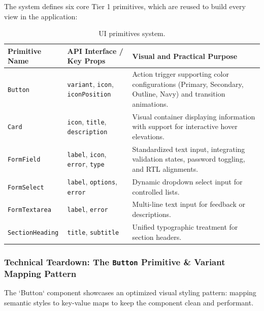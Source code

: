 \documentclass[12pt,a4paper]{article}
\begin{document}
The system defines six core Tier 1 primitives, which are reused to build every view in the application:

\begin{table}[H]
\centering
\begin{tabular}{@{}llp{7cm}@{}}
\toprule
\textbf{Primitive Name} & \textbf{API Interface / Key Props} & \textbf{Visual and Practical Purpose} \\
\midrule
\texttt{Button} & \texttt{variant}, \texttt{icon}, \texttt{iconPosition} & Action trigger supporting color configurations (Primary, Secondary, Outline, Navy) and transition animations. \\
\texttt{Card} & \texttt{icon}, \texttt{title}, \texttt{description} & Visual container displaying information with support for interactive hover elevations. \\
\texttt{FormField} & \texttt{label}, \texttt{icon}, \texttt{error}, \texttt{type} & Standardized text input, integrating validation states, password toggling, and RTL alignments. \\
\texttt{FormSelect} & \texttt{label}, \texttt{options}, \texttt{error} & Dynamic dropdown select input for controlled lists. \\
\texttt{FormTextarea} & \texttt{label}, \texttt{error} & Multi-line text input for feedback or descriptions. \\
\texttt{SectionHeading} & \texttt{title}, \texttt{subtitle} & Unified typographic treatment for section headers. \\
\bottomrule
\end{tabular}
\caption{UI primitives system.}
\end{table}

\subsubsection{Technical Teardown: The \texttt{Button} Primitive \& Variant Mapping Pattern}

The `Button` component showcases an optimized visual styling pattern: mapping semantic styles to key-value maps to keep the component clean and performant.
\end{document}
